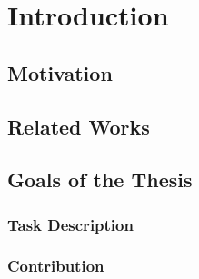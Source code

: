 \chapter{Introduction}

\section{Motivation}

\section{Related Works}

\section{Goals of the Thesis}

\subsection{Task Description}

\subsection{Contribution}
